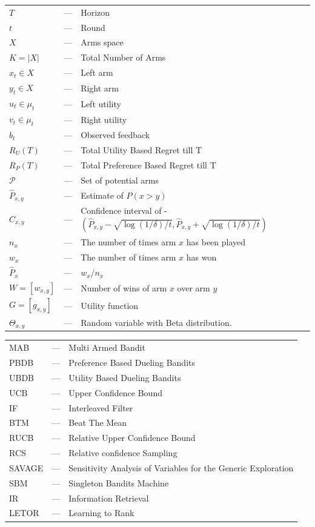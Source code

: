 \documentclass[MSc,beforeExam]{iitcsthesis}
\begin{document}
\begin{tabular}{lcl}
			$T$ & --- & Horizon \\
 			$t$ & --- &  Round \\
 			$X$ & --- & Arms space \\
 			$K = |X|$ & --- & Total Number of Arms\\
 			$x_t \in X$ & --- & Left arm \\
 			$y_t \in X$ & --- & Right arm \\
 			$u_t \in \mu_t$ & --- & Left utility \\
 			$v_t \in \mu_t$ & --- & Right utility \\
 			$b_t$ & --- & Observed feedback \\
 			$R_U(T)$ & --- & Total Utility Based Regret till T\\
			$R_P(T)$ & --- & Total Preference Based Regret till T\\
 			$\mathcal{P}$ & --- & Set of potential arms \\
 			$\hat{P}_{x, y}$ & --- & Estimate of $P(x>y)$\\
 			$\hat{C}_{x, y}$ & --- &   Confidence interval of - $(\hat{P}_{x, y} - \sqrt{\log(1/\delta)/t},\hat{P}_{x, y} +\sqrt{\log(1/\delta)/t})$\\
 			$n_x$ & --- & The number of times arm $x$ has been played\\
 			$w_x$ & --- & The number of times arm $x$ has won\\
 			$\hat{P}_x$ & --- &  $ w_x / n_x $\\
 			$ W = [w_{x,y}]$ & --- & Number of wins of arm $x$ over arm $y$\\
 			$G = [g_{x,y}]$ & --- & Utility function\\
 			$\Theta_{x,y}$ & --- & Random variable with Beta distribution.\\
 \end{tabular}
\newpage 
 \begin{tabular}{lcl}
 			MAB & --- & Multi Armed Bandit\\
 			PBDB & --- & Preference Based Dueling Bandits\\
 			UBDB & --- & Utility Based Dueling Bandits\\
 			UCB & --- & Upper Confidence Bound\\
 			IF & --- & Interleaved Filter\\
 			BTM & --- & Beat The Mean\\
 			RUCB & --- & Relative Upper Confidence Bound\\
 			RCS & --- & Relative confidence Sampling\\
 			SAVAGE & --- & Sensitivity Analysis of Variables for the Generic Exploration\\
 			SBM & --- & Singleton Bandits Machine\\
 			IR & --- & Information Retrieval\\
 			LETOR & --- & Learning to Rank
 			
 			
\end{tabular}
\end{document}

